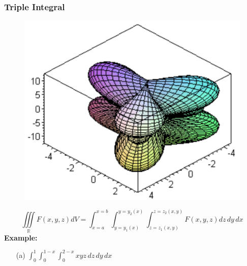 \documentclass{beamer}
\begin{document}
\begin{frame}
\frametitle{Triple Integral}
\begin{figure}
	\centering
	\includegraphics[height=.45\textheight]{IMG_0384.jpg}\\
	\hspace*{10pt}\hbox{}
\end{figure}

$$\iiint\limits_{\mathbb{R}} F(x,y,z) dV = \int_{x=a}^{x=b} \int_{y=y_1(x)}^{y=y_2(x)} \int_{z=z_1(x,y)}^{z=z_2(x,y)} F(x,y,z) dz\,dy\,dx$$
\textbf{Example:}
\begin{itemize}
	\item[(a)] $\int_0^1 \int_0^{1-x} \int_0^{2-x} xyz \,dz\,dy\,dx$
\end{itemize}
\end{frame}
\end{document}
